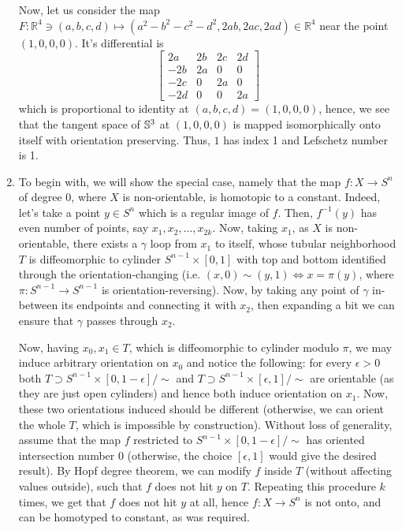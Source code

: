 \documentclass[8pt]{article} %
\begin{document}
\begin{enumerate}[label=\bfseries \arabic*.]
		Now, let us consider the map $F:\mathbb{R}^4\ni(a,b,c,d)\mapsto(a^2-b^2-c^2-d^2,2ab,2ac,2ad)\in\mathbb{R}^4$ near the point
		$(1,0,0,0)$. It's differential is
		\[\begin{bmatrix}2a&2b&2c&2d\\-2b&2a&0&0\\-2c&0&2a&0\\-2d&0&0&2a\end{bmatrix}\]
		which is proportional to identity at $(a,b,c,d)=(1,0,0,0)$, hence, we see that the tangent space of $\mathbb{S}^{3}$ at
		$(1,0,0,0)$ is mapped isomorphically onto itself with orientation preserving. Thus, $1$ has index 1 and Lefschetz number is 1.
	\item To begin with, we will show the special case, namely that the map $f:X\to S^n$ of degree 0, where
		$X$ is non-orientable, is homotopic to a constant. Indeed, let's take a point $y\in S^n$ which is a regular image of $f$. Then,
		$f^{-1}(y)$ has even number of points, say $x_1,x_2,\hdots,x_{2k}$. Now, taking $x_1$, as $X$ is non-orientable, there exists
		a $\gamma$ loop from $x_1$ to itself, whose tubular neighborhood $T$ is diffeomorphic to cylinder $S^{n-1}\times[0,1]$ with top
		and bottom identified through the orientation-changing (i.e. $(x,0)\sim(y,1)\iff x=\pi(y)$, where $\pi:S^{n-1}\to S^{n-1}$ is
		orientation-reversing). Now, by taking any point of $\gamma$ in-between its endpoints and connecting it with $x_2$,
		then expanding a bit we can ensure that $\gamma$ passes through $x_2$.\\

		Now, having $x_0,x_1\in T$, which is diffeomorphic to cylinder modulo $\pi$, we may induce arbitrary orientation on $x_0$ and
		notice the following: for every $\epsilon>0$ both $T\supset S^{n-1}\times [0,1-\epsilon]/\sim$ and $T\supset S^{n-1}\times
		[\epsilon,1]/\sim$ are orientable (as they are just open cylinders) and hence both induce orientation on $x_1$. Now, these
		two orientations induced should be different (otherwise, we can orient the whole $T$, which is impossible by construction). Without
		loss of generality, assume that the map $f$ restricted to $S^{n-1}\times[0,1-\epsilon]/\sim$ has oriented intersection number $0$
		(otherwise, the choice $[\epsilon,1]$ would give the desired result). By Hopf degree theorem, we can modify $f$ inside $T$ (without
		affecting values outside), such that $f$ does not hit $y$ on $T$. Repeating this procedure $k$ times, we get that 
		$f$ does not hit $y$ at all, hence $f:X\to S^n$ is not onto, and can be homotyped to constant, as was required.


\end{enumerate}
\end{document}
